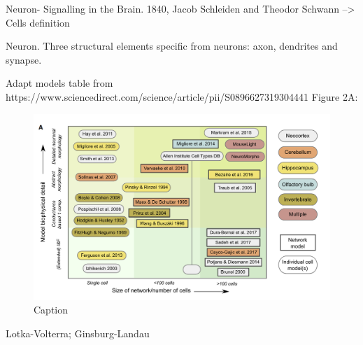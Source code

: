 Neuron- Signalling in the Brain. 
1840, Jacob Schleiden and Theodor Schwann --> Cells definition

Neuron. Three structural elements specific from neurons: axon, dendrites and synapse. 



Adapt models table from
https://www.sciencedirect.com/science/article/pii/S0896627319304441 Figure 2A:
\begin{figure}
    \centering
    \includegraphics[width=\textwidth]{misc/models-table.png}
    \caption{Caption}
    \label{fig:models-table}
\end{figure}

Lotka-Volterra; Ginsburg-Landau
